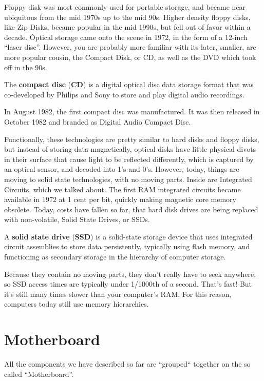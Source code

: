 
Floppy disk was most commonly used for portable storage, and became near ubiquitous from the mid 1970s up to the mid
90s. Higher density floppy disks, like Zip Disks, became popular in the mid 1990s, but fell out of favor within a
decade. \v

Optical storage came onto the scene in 1972, in the form of a 12-inch ``laser disc''. However, you are probably more
familiar with its later, smaller, are more popular cousin, the Compact Disk, or CD, as well as the DVD which took off
in the 90s.

The \textbf{compact disc} (\textbf{CD}) is a digital optical disc data storage format that was co-developed by
Philips and Sony to store and play digital audio recordings.
\ed

In August 1982, the first compact disc was manufactured. It was then released in October 1982 and branded as Digital
Audio Compact Disc.


Functionally, these technologies are pretty similar to hard disks and floppy disks, but instead of storing data
magnetically, optical disks have little physical divots in their surface that cause light to be reflected differently,
which is captured by an optical sensor, and decoded into 1's and 0's. However, today, things are moving to solid
state technologies, with no moving parts. Inside are Integrated Circuits, which we talked about. The first RAM
integrated circuits became available in 1972 at 1 cent per bit, quickly making magnetic core memory obsolete. Today,
costs have fallen so far, that hard disk drives are being replaced with non-volatile, Solid State Drives, or SSDs.

A \textbf{solid state drive} (\textbf{SSD}) is a solid-state storage device that uses integrated circuit assemblies
to store data persistently, typically using flash memory, and functioning as secondary storage in the hierarchy of
computer storage.
\ed


Because they contain no moving parts, they don't really have to seek anywhere, so SSD access times are typically
under 1/1000th of a second. That's fast! But it's still many times slower than your computer's RAM. For this reason,
computers today still use memory hierarchies.

\section{Motherboard}
All the components we have described so far are ``grouped`` together on the so called ``Motherboard''.

